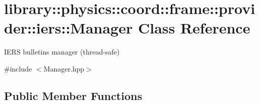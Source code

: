 \hypertarget{classlibrary_1_1physics_1_1coord_1_1frame_1_1provider_1_1iers_1_1_manager}{}\section{library\+:\+:physics\+:\+:coord\+:\+:frame\+:\+:provider\+:\+:iers\+:\+:Manager Class Reference}
\label{classlibrary_1_1physics_1_1coord_1_1frame_1_1provider_1_1iers_1_1_manager}


I\+E\+RS bulletins manager (thread-\/safe)  




{\ttfamily \#include $<$Manager.\+hpp$>$}

\subsection*{Public Member Functions}
